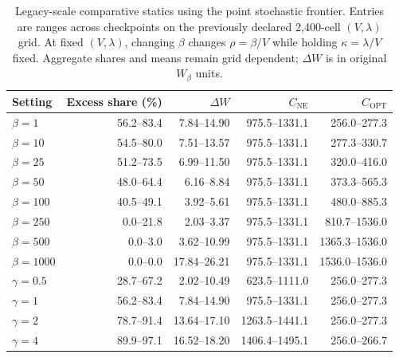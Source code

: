 \begin{table}[H]
\centering
\caption{Legacy-scale comparative statics using the point stochastic frontier. Entries are ranges across checkpoints on the previously declared 2,400-cell $(V,\lambda)$ grid. At fixed $(V,\lambda)$, changing $\beta$ changes $\rho=\beta/V$ while holding $\kappa=\lambda/V$ fixed. Aggregate shares and means remain grid dependent; $\Delta W$ is in original $W_\beta$ units.}
\label{tab:strategicsensitivity}
\small
\setlength{\tabcolsep}{3.2pt}
\begin{tabular}{lrrrr}
\toprule
Setting & Excess share (\%) & $\Delta W$ & $C_{\mathrm{NE}}$ & $C_{\mathrm{OPT}}$ \\
\midrule
$\beta=1$ & 56.2--83.4 & 7.84--14.90 & 975.5--1331.1 & 256.0--277.3 \\
$\beta=10$ & 54.5--80.0 & 7.51--13.57 & 975.5--1331.1 & 277.3--330.7 \\
$\beta=25$ & 51.2--73.5 & 6.99--11.50 & 975.5--1331.1 & 320.0--416.0 \\
$\beta=50$ & 48.0--64.4 & 6.16--8.84 & 975.5--1331.1 & 373.3--565.3 \\
$\beta=100$ & 40.5--49.1 & 3.92--5.61 & 975.5--1331.1 & 480.0--885.3 \\
$\beta=250$ & 0.0--21.8 & 2.03--3.37 & 975.5--1331.1 & 810.7--1536.0 \\
$\beta=500$ & 0.0--3.0 & 3.62--10.99 & 975.5--1331.1 & 1365.3--1536.0 \\
$\beta=1000$ & 0.0--0.0 & 17.84--26.21 & 975.5--1331.1 & 1536.0--1536.0 \\
\midrule
$\gamma=0.5$ & 28.7--67.2 & 2.02--10.49 & 623.5--1111.0 & 256.0--277.3 \\
$\gamma=1$ & 56.2--83.4 & 7.84--14.90 & 975.5--1331.1 & 256.0--277.3 \\
$\gamma=2$ & 78.7--91.4 & 13.64--17.10 & 1263.5--1441.1 & 256.0--277.3 \\
$\gamma=4$ & 89.9--97.1 & 16.52--18.20 & 1406.4--1495.1 & 256.0--266.7 \\
\bottomrule
\end{tabular}
\end{table}
